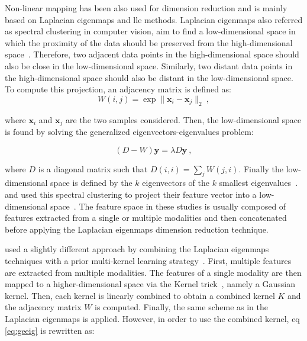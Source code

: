 Non-linear mapping has been also used for dimension reduction and is mainly based on Laplacian eigenmaps and \acf{lle} methods.
Laplacian eigenmaps also referred as spectral clustering in computer vision, aim to find a low-dimensional space in which the proximity of the data should be preserved from the high-dimensional space~\cite{Shi2000,Belkin2001}.
Therefore, two adjacent data points in the high-dimensional space should also be close in the low-dimensional space.
Similarly, two distant data points in the high-dimensional space should also be distant in the low-dimensional space.
To compute this projection, an adjacency matrix is defined as:
\begin{equation}
	W(i,j) = \exp \| \mathbf{x}_i - \mathbf{x}_j \|_2 \ ,
	\label{eq:gew}
\end{equation}

\noindent where $\mathbf{x}_i$ and $\mathbf{x}_j$ are the two samples considered.
Then, the low-dimensional space is found by solving the generalized eigenvectors-eigenvalues problem:

\begin{equation}
	(D-W)\mathbf{y} = \lambda D \mathbf{y} \ ,
	\label{eq:geeig}
\end{equation}

\noindent where $D$ is a diagonal matrix such that $D(i,i) = \sum_j W(j,i)$.
Finally the low-dimensional space is defined by the $k$ eigenvectors of the $k$ smallest eigenvalues~\cite{Belkin2001}.
\citeauthor{Tiwari2009a} and \citeauthor{Viswanath2008} used this spectral clustering to project their feature vector into a low-dimensional space~\cite{Tiwari2007,Tiwari2009,Tiwari2009a,Viswanath2008}.
The feature space in these studies is usually composed of features extracted from a single or multiple modalities and then concatenated before applying the Laplacian eigenmaps dimension reduction technique.

\citeauthor{Tiwari2013} used a slightly different approach by combining the Laplacian eigenmaps techniques with a prior multi-kernel learning strategy~\cite{Tiwari2009,Tiwari2013}.
First, multiple features are extracted from multiple modalities.
The features of a single modality are then mapped to a higher-dimensional space via the Kernel trick~\cite{Aizerman1964}, namely a Gaussian kernel.
Then, each kernel is linearly combined to obtain a combined kernel $K$ and the adjacency matrix $W$ is computed.
Finally, the same scheme as in the Laplacian eigenmaps is applied.
However, in order to use the combined kernel, \acs{eq}\,\eqref{eq:geeig} is rewritten as:

